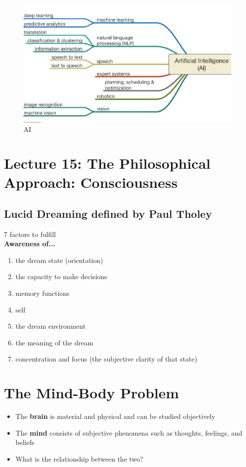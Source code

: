 \documentclass{article}
\begin{document}
\begin{figure}[htp]
\centering
\includegraphics[width=15cm]{images/AI.JPG}
\caption{AI}
\label{fig: ai}
\end{figure}

\section{Lecture 15: The Philosophical Approach: Consciousness}

\subsection{Lucid Dreaming defined by Paul Tholey}
7 factors to fulfill \\ 
\textbf{Awareness of...}
\begin{enumerate}
    \item the dream state (orientation)
    \item the capacity to make decisions
    \item memory functions
    \item self
    \item the dream environment
    \item the meaning of the dream
    \item concentration and focus (the subjective clarity of that state) 
\end{enumerate}

\section{The Mind-Body Problem}
\begin{itemize}
    \item The \textbf{brain} is material and physical and can be studied objectively
    \item The \textbf{mind} consists of subjective phenomena such as thoughts, feelings, and beliefs
    \item What is the relationship between the two?
\end{itemize}
\end{document}

